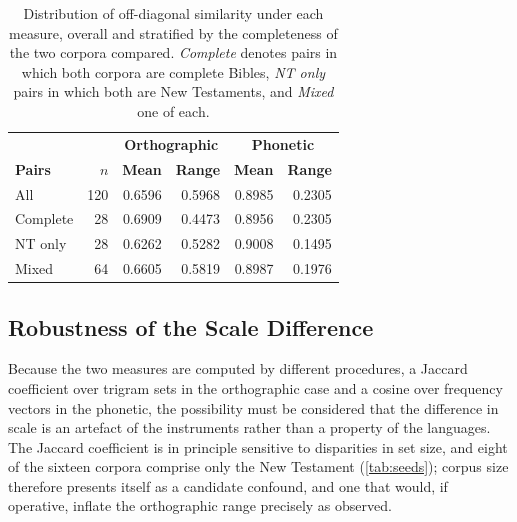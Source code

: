 \begin{table}[h!]
    \centering
    \scriptsize
    \setlength{\tabcolsep}{3.5pt}
    \begin{tabular}{lrrrrr}
        \hline
                       &                & \multicolumn{2}{c}{\textbf{Orthographic}} & \multicolumn{2}{c}{\textbf{Phonetic}}                             \\
        \textbf{Pairs} & \textbf{\(n\)} & \textbf{Mean}                             & \textbf{Range}                        & \textbf{Mean} & \textbf{Range} \\
        \hline
        All            & 120            & 0.6596                                    & 0.5968                                & 0.8985        & 0.2305         \\
        Complete       & 28             & 0.6909                                    & 0.4473                                & 0.8956        & 0.2305         \\
        NT only        & 28             & 0.6262                                    & 0.5282                                & 0.9008        & 0.1495         \\
        Mixed          & 64             & 0.6605                                    & 0.5819                                & 0.8987        & 0.1976         \\
        \hline
    \end{tabular}
    \caption{Distribution of off-diagonal similarity under each measure, overall
        and stratified by the completeness of the two corpora compared.
        \emph{Complete} denotes pairs in which both corpora are complete Bibles,
        \emph{NT only} pairs in which both are New Testaments, and \emph{Mixed}
        one of each.}\label{tab:metric_comparison}
\end{table}

\subsection{Robustness of the Scale Difference}

Because the two measures are computed by different procedures, a Jaccard
coefficient over trigram sets in the orthographic case and a cosine over
frequency vectors in the phonetic, the possibility must be considered that the
difference in scale is an artefact of the instruments rather than a property of
the languages. The Jaccard coefficient is in principle sensitive to disparities
in set size, and eight of the sixteen corpora comprise only the New Testament
(\cref{tab:seeds}); corpus size therefore presents itself as a candidate
confound, and one that would, if operative, inflate the orthographic range
precisely as observed.

